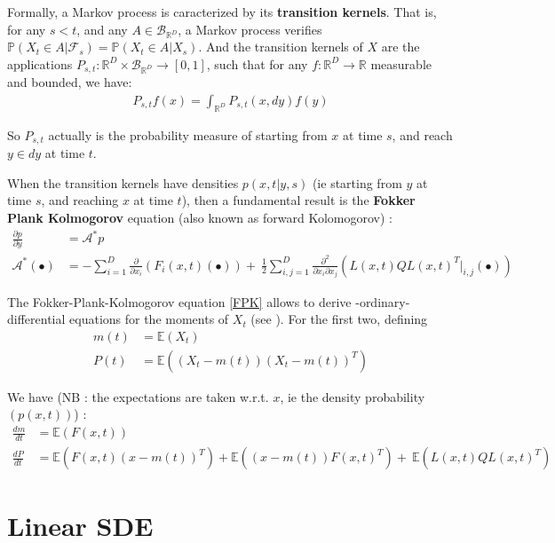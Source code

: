 Formally, a Markov process is caracterized by its \textbf{transition kernels}. 
That is, for any $s < t$, and any $A \in \mathcal{B}_{\mathbb{R}^{D}}$, a Markov process verifies 
$\mathbb{P}(X_t \in A \vert \mathcal{F}_s) = \mathbb{P}(X_t \in A \vert X_s)$. And the transition kernels 
of $X$ are the applications $P_{s,t} : \mathbb{R}^{D} \times \mathcal{B}_{\mathbb{R}^{D}} \rightarrow [0,1]$, 
such that for any $f : \mathbb{R}^{D} \rightarrow \mathbb{R}$ measurable and bounded, we have:
\begin{align}
    P_{s,t}f(x) = \int_{{\mathbb{R}^{D}}} P_{s,t}(x,dy) f(y)
\end{align}

So $P_{s,t}$ actually is the probability measure of starting from $x$ at time $s$, and reach $y \in dy$ at time $t$.

When the transition kernels have densities $p(x,t \vert y,s)$ (ie starting from $y$ at time $s$, and
reaching $x$ at time $t$), then a fundamental result is the \textbf{Fokker Plank Kolmogorov} equation 
(also known as forward Kolomogorov) :
\begin{align}
    \label{FPK}
    \frac{\partial p}{\partial y} &= \mathcal{A}^{*}p \\
    \mathcal{A}^{*}(\bullet) &= - \sum_{i=1}^{D} \frac{\partial}{\partial x_i} (F_i(x,t)(\bullet)) + \
        \frac{1}{2} \sum_{i,j=1}^{D} \frac{\partial^{2}}{\partial x_i \partial x_j} (L(x,t)QL(x,t)^{T}\vert_{i,j} (\bullet))
\end{align}


The Fokker-Plank-Kolmogorov equation \ref{FPK} allows to derive -ordinary- differential equations for the moments 
of $X_t$ (see \cite{sarkka_applied_2019}). For the first two, defining
\begin{align}
    m(t) &= \mathbb{E}(X_t) \\
    P(t) &= \mathbb{E}((X_t - m(t))(X_t-m(t))^{T})
\end{align}

We have (NB : the expectations are taken w.r.t. $x$, ie the density probability $(p(x,t))$) :
\begin{align}
    \label{SDE_moments}
    \frac{dm}{dt} &= \mathbb{E}(F(x,t)) \\
    \frac{dP}{dt} &= \mathbb{E}(F(x,t)(x-m(t))^{T}) + \mathbb{E}((x-m(t)) F(x,t)^{T}) +\
    \mathbb{E}(L(x,t)QL(x,t)^{T})
\end{align}


\section{Linear SDE}

